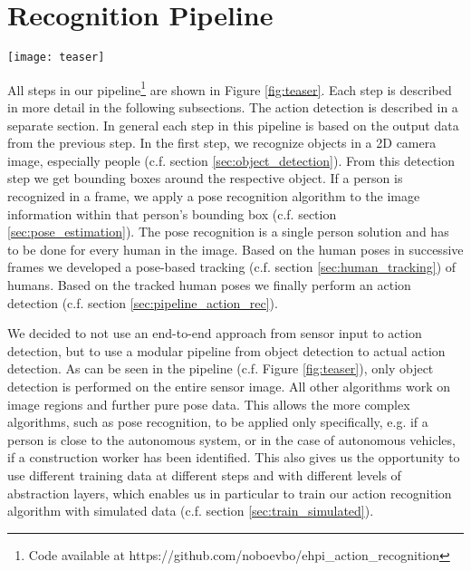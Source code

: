 \documentclass[a4paper, 10pt, conference]{ieeeconf}
\begin{document}
\section{Recognition Pipeline}
\label{sec:recognition_pipeline}
\begin{figure*}
  \centering
  \texttt{[image: teaser]}
  \caption{Real-time action recognition pipeline from a monocular camera mounted in the car observing the gesture of a potential user of the autonomous vehicle. From left to right: 1) Raw camera image, 2) Object detection~\cite{redmonYOLOv3IncrementalImprovement2018}, 3) Pose Recognition~\cite{xiaoSimpleBaselinesHuman2018}, 4) Pose-based human tracking and 5) Pose-based action recognition}
  \label{fig:teaser}
\end{figure*}
All steps in our pipeline\footnote{Code available at https://github.com/noboevbo/ehpi\_action\_recognition} are shown in Figure \ref{fig:teaser}. Each step is described in more detail in the following subsections. The action detection is described in a separate section. In general each step in this pipeline is based on the output data from the previous step. In the first step, we recognize objects in a 2D camera image, especially people (c.f. section \ref{sec:object_detection}). From this detection step we get bounding boxes around the respective object. If a person is recognized in a frame, we apply a pose recognition algorithm to the image information within that person's bounding box (c.f. section \ref{sec:pose_estimation}). The pose recognition is a single person solution and has to be done for every human in the image. Based on the human poses in successive frames we developed a pose-based tracking (c.f. section \ref{sec:human_tracking}) of humans. Based on the tracked human poses we finally perform an action detection (c.f. section \ref{sec:pipeline_action_rec}).

We decided to not use an end-to-end approach from sensor input to action detection, but to use a modular pipeline from object detection to actual action detection. As can be seen in the pipeline (c.f. Figure \ref{fig:teaser}), only object detection is performed on the entire sensor image. All other algorithms work on image regions and further pure pose data. This allows the more complex algorithms, such as pose recognition, to be applied only specifically, e.g. if a person is close to the autonomous system, or in the case of autonomous vehicles, if a construction worker has been identified. This also gives us the opportunity to use different training data at different steps and with different levels of abstraction layers, which enables us in particular to train our action recognition algorithm with simulated data (c.f. section \ref{sec:train_simulated}).
\end{document}
